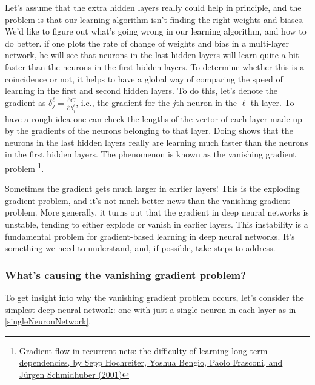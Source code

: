 \documentclass[12pt, letterpaper]{article}
\theoremstyle{definition}
\newcommand{\pr}{\mathrm{\partial}}
\begin{document}
Let's assume that the extra hidden layers really could help in principle, and the problem is that our learning algorithm isn't finding the right weights and biases. We'd like to figure out what's going wrong in our learning algorithm, and how to do better. if one plots the rate of change of weights and bias in a multi-layer network, he will see that neurons in the last hidden layers will learn quite a bit faster than the neurons in the first hidden layers.
To determine whether this is a coincidence or not, it helps to have a global way of comparing the speed of learning in the first and second hidden layers. To do this, let's denote the gradient as $\delta^\ell_j=\frac{\pr C}{\pr b^\ell_j}$, i.e., the gradient for the $j$th neuron in the $\ell$-th layer. To have a rough idea one can check the lengths of the vector of each layer made up by the gradients of the neurons belonging to that layer. Doing shows that the neurons in the last hidden layers really are learning much faster than the neurons in the first hidden layers. The phenomenon is known as the vanishing gradient problem \footnote{\href{http://citeseerx.ist.psu.edu/viewdoc/summary?doi=10.1.1.24.7321}{Gradient flow in recurrent nets: the difficulty of learning long-term dependencies, by Sepp Hochreiter, Yoshua Bengio, Paolo Frasconi, and Jürgen Schmidhuber (2001)}}. 

Sometimes the gradient gets much larger in earlier layers! This is the exploding gradient problem, and it's not much better news than the vanishing gradient problem. More generally, it turns out that the gradient in deep neural networks is unstable, tending to either explode or vanish in earlier layers. This instability is a fundamental problem for gradient-based learning in deep neural networks. It's something we need to understand, and, if possible, take steps to address.

\subsubsection{What's causing the vanishing gradient problem?}
To get insight into why the vanishing gradient problem occurs, let's consider the simplest deep neural network: one with just a single neuron in each layer as in \autoref{singleNeuronNetwork}.
\end{document}
